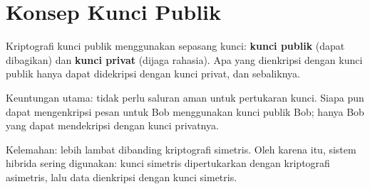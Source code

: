 \section{Konsep Kunci Publik}

Kriptografi kunci publik menggunakan sepasang kunci: \textbf{kunci publik} (dapat dibagikan) dan \textbf{kunci privat} (dijaga rahasia). Apa yang dienkripsi dengan kunci publik hanya dapat didekripsi dengan kunci privat, dan sebaliknya.

Keuntungan utama: tidak perlu saluran aman untuk pertukaran kunci. Siapa pun dapat mengenkripsi pesan untuk Bob menggunakan kunci publik Bob; hanya Bob yang dapat mendekripsi dengan kunci privatnya.

Kelemahan: lebih lambat dibanding kriptografi simetris. Oleh karena itu, sistem hibrida sering digunakan: kunci simetris dipertukarkan dengan kriptografi asimetris, lalu data dienkripsi dengan kunci simetris.

